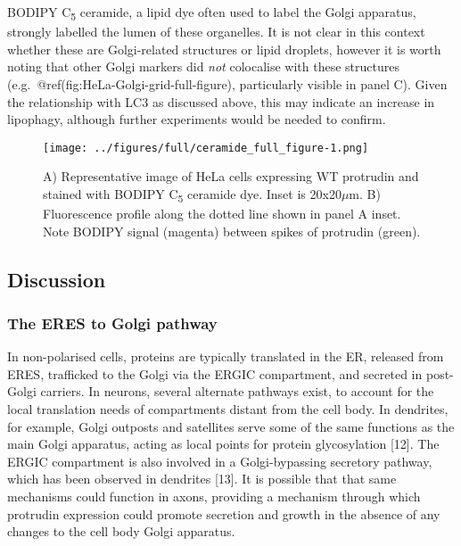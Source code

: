 \documentclass[
  12pt,
  a4paper,
]{article}
\begin{document}
BODIPY C\textsubscript{5} ceramide, a lipid dye often used to label the
Golgi apparatus, strongly labelled the lumen of these organelles. It is
not clear in this context whether these are Golgi-related structures or
lipid droplets, however it is worth noting that other Golgi markers did
\emph{not} colocalise with these structures
(e.g.~@ref(fig:HeLa-Golgi-grid-full-figure), particularly visible in
panel C). Given the relationship with LC3 as discussed above, this may
indicate an increase in lipophagy, although further experiments would be
needed to confirm.

\begin{figure}
\centering
\texttt{[image: ../figures/full/ceramide\_full\_figure-1.png]}
\caption{A) Representative image of HeLa cells expressing WT protrudin
and stained with BODIPY C\textsubscript{5} ceramide dye. Inset is
20x20\(\mu\)m. B) Fluorescence profile along the dotted line shown in
panel A inset. Note BODIPY signal (magenta) between spikes of protrudin
(green).}
\end{figure}

\hypertarget{discussion}{%
\subsection{Discussion}\label{discussion}}

\hypertarget{the-eres-to-golgi-pathway}{%
\subsubsection{The ERES to Golgi
pathway}\label{the-eres-to-golgi-pathway}}

In non-polarised cells, proteins are typically translated in the ER,
released from ERES, trafficked to the Golgi via the ERGIC compartment,
and secreted in post-Golgi carriers. In neurons, several alternate
pathways exist, to account for the local translation needs of
compartments distant from the cell body. In dendrites, for example,
Golgi outposts and satellites serve some of the same functions as the
main Golgi apparatus, acting as local points for protein glycosylation
{[}12{]}. The ERGIC compartment is also involved in a Golgi-bypassing
secretory pathway, which has been observed in dendrites {[}13{]}. It is
possible that that same mechanisms could function in axons, providing a
mechanism through which protrudin expression could promote secretion and
growth in the absence of any changes to the cell body Golgi apparatus.
\end{document}

